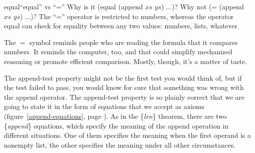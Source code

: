 \begin{aside}{equal}{``\textsf{equal}'' vs ``\textsf{=}''}
Why is it \textsf{(equal (append $xs$ $ys$) $\dots$)}?
Why not \textsf{(= (append $xs$ $ys$) $\dots$)}?
The ``\textsf{=}'' operator
is restricted to numbers, whereas the operator \textsf{equal} can check
for equality between any two values: numbers, lists, whatever.

The $=$ symbol reminds people who are
reading the formula that it compares numbers.
It reminds the computer, too, and that could
simplify mechanized reasoning or
promote efficient comparison.
Mostly, though, it's a matter of
taste.
\end{aside}

The append-test property might not be the first test you would think of,
but if the test failed to pass,
you would know for sure that something was wrong with the \textsf{append} operator.
The append-test property is so plainly correct that
we are going to state it in the form of equations that we accept as axioms
(figure~\ref{append-equations}, page \pageref{append-equations}).
As in the \{\emph{len}\} theorem, there are two \{\emph{append}\} equations,
which specify the meaning of the append operation in different situations.
One of them specifies the meaning when the first operand is a nonempty list,
the other specifies the meaning under all other circumstances.

